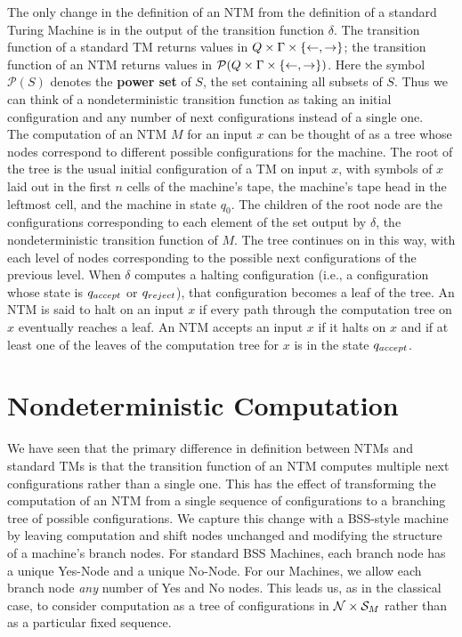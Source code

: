 The only change in the definition of an NTM from the definition of a
standard Turing Machine is in the output of the transition function
$\delta$.  The transition function of a standard TM returns values in
$Q \times \Gamma \times \{\leftarrow, \rightarrow\}$; the transition
function of an NTM returns values in $\mathcal{P}(Q \times \Gamma \times
  \{\leftarrow, \rightarrow\})$.  Here the symbol $\mathcal{P}(S)$
denotes the \textbf{power set} of $S$, the set containing all subsets
of $S$.  Thus we can think of a nondeterministic transition function
as taking an initial configuration and any number of next
configurations instead of a single one.\\

The computation of an NTM $M$ for an input $x$ can be thought of as a
tree whose nodes correspond to different possible configurations for
the machine.  The root of the tree is the usual initial configuration
of a TM on input $x$, with symbols of $x$ laid out in the first $n$
cells of the machine's tape, the machine's tape head in the leftmost
cell, and the machine in state $q_0$.  The children of the root node
are the configurations corresponding to each element of the set output
by $\delta$, the nondeterministic transition function of $M$.  The
tree continues on in this way, with each level of nodes corresponding
to the possible next configurations of the previous level.  When
$\delta$ computes a halting configuration (i.e., a configuration whose
state is $q_{accept}$ or $q_{reject}$), that configuration becomes a leaf
of the tree.  An NTM is said to halt on an input $x$ if every path
through the computation tree on $x$ eventually reaches a leaf.  An NTM
accepts an input $x$ if it halts on $x$ and if at least one of the
leaves of the computation tree for $x$ is in the state $q_{accept}$.\\


\section{Nondeterministic Computation}

We have seen that the primary difference in definition between NTMs
and standard TMs is that the transition function of an NTM computes
multiple next configurations rather than a single one.  This has the
effect of transforming the computation of an NTM from a single
sequence of configurations to a branching tree of possible
configurations.  We capture this change with a BSS-style machine by
leaving computation and shift nodes unchanged and modifying the
structure of a machine's branch nodes.  For standard BSS Machines,
each branch node has a unique Yes-Node and a unique No-Node.  For our
\ndet Machines, we allow each branch node \emph{any} number of Yes and
No nodes.  This leads us, as in the classical case, to consider
computation as a tree of configurations in $\mathcal{N} \times
\mathcal{S}_M$ rather than as a particular fixed sequence.\\

